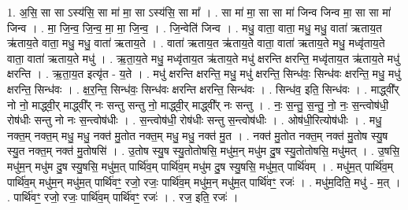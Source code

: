 \documentclass[17pt]{extarticle}
\begin{document}
1. अ॒सि॒ सा सा ऽस्य॑सि॒ सा मा॑ मा॒ सा ऽस्य॑सि॒ सा मा᳚ । . सा मा॑ मा॒ सा सा मा॑ जिन्व जिन्व मा॒ सा सा मा॑ जिन्व । . मा॒ जि॒न्व॒ जि॒न्व॒ मा॒ मा॒ जि॒न्व॒ । . जि॒न्वेति॑ जिन्व । . मधु॒ वाता॒ वाता॒ मधु॒ मधु॒ वाता॑ ऋताय॒त ऋ॑ताय॒ते वाता॒ मधु॒ मधु॒ वाता॑ ऋताय॒ते । . वाता॑ ऋताय॒त ऋ॑ताय॒ते वाता॒ वाता॑ ऋताय॒ते मधु॒ मध्वृ॑ताय॒ते वाता॒ वाता॑ ऋताय॒ते मधु॑ । . ऋ॒ता॒य॒ते मधु॒ मध्वृ॑ताय॒त ऋ॑ताय॒ते मधु॑ क्षरन्ति क्षरन्ति॒ मध्वृ॑ताय॒त ऋ॑ताय॒ते मधु॑ क्षरन्ति । . ऋ॒ता॒य॒त इत्यृ॑त - य॒ते । . मधु॑ क्षरन्ति क्षरन्ति॒ मधु॒ मधु॑ क्षरन्ति॒ सिन्ध॑वः॒ सिन्ध॑वः क्षरन्ति॒ मधु॒ मधु॑ क्षरन्ति॒ सिन्ध॑वः । . क्ष॒र॒न्ति॒ सिन्ध॑वः॒ सिन्ध॑वः क्षरन्ति क्षरन्ति॒ सिन्ध॑वः । . सिन्ध॑व॒ इति॒ सिन्ध॑वः । . माद्ध्वी᳚र् नो नो॒ माद्ध्वी॒र् माद्ध्वी᳚र् नः सन्तु सन्तु नो॒ माद्ध्वी॒र् माद्ध्वी᳚र् नः सन्तु । . नः॒ स॒न्तु॒ स॒न्तु॒ नो॒ नः॒ स॒न्त्वोष॑धी॒ रोष॑धीः सन्तु नो नः स॒न्त्वोष॑धीः । . स॒न्त्वोष॑धी॒ रोष॑धीः सन्तु स॒न्त्वोष॑धीः । . ओष॑धी॒रित्योष॑धीः । . मधु॒ नक्त॒म् नक्त॒म् मधु॒ मधु॒ नक्त॑ मु॒तोत नक्त॒म् मधु॒ मधु॒ नक्त॑ मु॒त । . नक्त॑ मु॒तोत नक्त॒म् नक्त॑ मु॒तोष स्यु॒ष स्यु॒त नक्त॒म् नक्त॑ मु॒तोषसि॑ । . उ॒तोष स्यु॒ष स्यु॒तोतोषसि॒ मधु॑म॒न् मधु॑म दु॒ष स्यु॒तोतोषसि॒ मधु॑मत् । . उ॒षसि॒ मधु॑म॒न् मधु॑म दु॒ष स्यु॒षसि॒ मधु॑म॒त् पार्थि॑व॒म् पार्थि॑व॒म् मधु॑म दु॒ष स्यु॒षसि॒ मधु॑म॒त् पार्थि॑वम् । . मधु॑म॒त् पार्थि॑व॒म् पार्थि॑व॒म् मधु॑म॒न् मधु॑म॒त् पार्थि॑वꣳ॒॒ रजो॒ रजः॒ पार्थि॑व॒म् मधु॑म॒न् मधु॑म॒त् पार्थि॑वꣳ॒॒ रजः॑ । . मधु॑म॒दिति॒ मधु॑ - म॒त् । . पार्थि॑वꣳ॒॒ रजो॒ रजः॒ पार्थि॑व॒म् पार्थि॑वꣳ॒॒ रजः॑ । . रज॒ इति॒ रजः॑ । \newline
\end{document}
